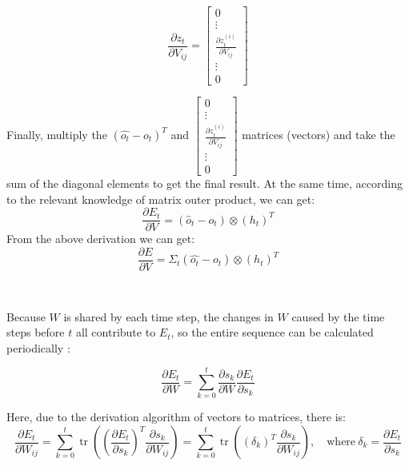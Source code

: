 \documentclass[oneside,solution]{seu-ml-assign}
\begin{document}
\[
  \frac{\partial z_t}{\partial V_{ij}} = \begin{bmatrix}
    0                                          \\
    \vdots                                     \\
    \frac{\partial z_t^{(i)}}{\partial V_{ij}} \\
    \vdots                                     \\
    0
  \end{bmatrix}
\]


Finally, multiply the $(\hat{o_{t}}-o_{t})^{T}$ and $\begin{bmatrix}
    0                                          \\
    \vdots                                     \\
    \frac{\partial z_t^{(i)}}{\partial V_{ij}} \\
    \vdots                                     \\
    0
  \end{bmatrix}$ matrices (vectors) and take the sum of the diagonal elements to get the final result.
At the same time, according to the relevant knowledge of matrix outer product, we can get:
\begin{equation}\frac{\partial E_t}{\partial V}=(\hat{o}_t-o_t)\otimes(h_t)^T\end{equation}
From the above derivation we can get:
\begin{equation}\frac{\partial E}{\partial V}=\Sigma_t(\hat{o_t}-o_t)\otimes(h_t)^T\end{equation}



\

Because \( W \) is shared by each time step, the changes in \( W \) caused by the time steps before \( t \) all contribute to \( E_t \), so the entire sequence can be calculated periodically :

\begin{equation}
  \frac{\partial E_t}{\partial W} = \sum_{k=0}^t \frac{\partial s_k}{\partial W} \frac{\partial E_t}{\partial s_k}
\end{equation}

Here, due to the derivation algorithm of vectors to matrices, there is:
\[
  \frac{\partial E_t}{\partial W_{ij}} = \sum_{k=0}^t \operatorname{tr}\left(\left(\frac{\partial E_t}{\partial s_k}\right)^T \frac{\partial s_k}{\partial W_{ij}}\right) = \sum_{k=0}^t \operatorname{tr}\left(\left(\delta_k \right)^T \frac{\partial s_k}{\partial W_{ij}}\right), \quad \text{where} \ \delta_k = \frac{\partial E_t}{\partial s_k}
\]
\end{document}
